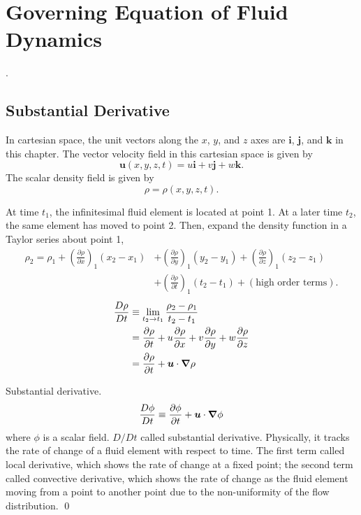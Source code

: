 \chapter{Governing Equation of Fluid Dynamics}
\citet{anderson2008computational}.
\section{Substantial Derivative}
In cartesian space, the unit vectors along the $x$, $y$, and $z$ axes are $\bm{i}$, $\bm{j}$, and $\bm{k}$ in this chapter. 
The vector velocity field in this cartesian space is given by 
\begin{equation}
    \bm{u}(x,y,z,t) = u\bm{i} + v\bm{j} + w\bm{k}. 
\end{equation}
The scalar density field is given by 
\begin{equation}
    \rho = \rho (x,y,z,t). 
\end{equation}

At time $t_1$, the infinitesimal fluid element is located at point 1. At a later time $t_2$, the same element has moved to point 2. Then, expand the density function in a Taylor series about point 1, 
\begin{equation}
\begin{aligned}
    \rho_2 = 
    \rho_1 
    + \left(\frac{\partial \rho}{\partial x}\right)_1 (x_2 -x_1)
    &+ \left(\frac{\partial \rho}{\partial y}\right)_1 (y_2 -y_1)
    + \left(\frac{\partial \rho}{\partial z}\right)_1 (z_2 -z_1) \\
    &+ \left(\frac{\partial \rho}{\partial t}\right)_1 (t_2 -t_1)
    + (\text{high order terms}).
\end{aligned}
\end{equation}
\begin{equation}
\begin{aligned}
    \frac{{D} \rho}{{D} t} &\equiv
    \lim _{t_{2} \to t_{1}} 
    \frac{\rho_{2}-\rho_{1}}{t_{2}-t_{1}} \\
    &= \frac{\partial \rho}{\partial t}
    +u \frac{\partial \rho}{\partial x}
    +v \frac{\partial \rho}{\partial y}
    +w \frac{\partial \rho}{\partial z} \\
    &= \frac{\partial \rho}{\partial t}
    +\bm{u} \cdot \grad \rho
\end{aligned}
\end{equation}

\begin{definition}
    Substantial derivative. 
    \begin{equation}
        \frac{{D} \phi}{{D} t} 
        \equiv 
        \frac{\partial \phi}{\partial t}
        +\bm{u} \cdot \grad \phi
    \end{equation}
    where $\phi$ is a scalar field. 
    $D/Dt$ called substantial derivative. 
    Physically, it tracks the rate of change of a fluid element with respect to time. 
    The first term called local derivative, which shows the rate of change at a fixed point; 
    the second term called convective derivative, which shows the rate of change as the fluid element moving from a point to another point due to the non-uniformity of the flow distribution. 
    \qed 
\end{definition}

